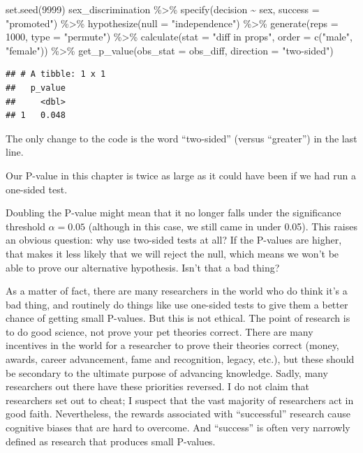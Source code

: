 \documentclass[
]{book}
\newenvironment{Shaded}{\begin{snugshade}}{\end{snugshade}}
\newcommand{\AttributeTok}[1]{\textcolor[rgb]{0.77,0.63,0.00}{#1}}
\newcommand{\DecValTok}[1]{\textcolor[rgb]{0.00,0.00,0.81}{#1}}
\newcommand{\FunctionTok}[1]{\textcolor[rgb]{0.00,0.00,0.00}{#1}}
\newcommand{\NormalTok}[1]{#1}
\newcommand{\SpecialCharTok}[1]{\textcolor[rgb]{0.00,0.00,0.00}{#1}}
\newcommand{\StringTok}[1]{\textcolor[rgb]{0.31,0.60,0.02}{#1}}
\begin{document}
\begin{Shaded}
\begin{Highlighting}[]
\FunctionTok{set.seed}\NormalTok{(}\DecValTok{9999}\NormalTok{)}
\NormalTok{sex\_discrimination }\SpecialCharTok{\%\textgreater{}\%}
    \FunctionTok{specify}\NormalTok{(decision }\SpecialCharTok{\textasciitilde{}}\NormalTok{ sex, }\AttributeTok{success =} \StringTok{"promoted"}\NormalTok{) }\SpecialCharTok{\%\textgreater{}\%}
    \FunctionTok{hypothesize}\NormalTok{(}\AttributeTok{null =} \StringTok{"independence"}\NormalTok{) }\SpecialCharTok{\%\textgreater{}\%}
    \FunctionTok{generate}\NormalTok{(}\AttributeTok{reps =} \DecValTok{1000}\NormalTok{, }\AttributeTok{type =} \StringTok{"permute"}\NormalTok{) }\SpecialCharTok{\%\textgreater{}\%}
    \FunctionTok{calculate}\NormalTok{(}\AttributeTok{stat =} \StringTok{"diff in props"}\NormalTok{, }\AttributeTok{order =} \FunctionTok{c}\NormalTok{(}\StringTok{"male"}\NormalTok{, }\StringTok{"female"}\NormalTok{)) }\SpecialCharTok{\%\textgreater{}\%}
    \FunctionTok{get\_p\_value}\NormalTok{(}\AttributeTok{obs\_stat =}\NormalTok{ obs\_diff, }\AttributeTok{direction =} \StringTok{"two{-}sided"}\NormalTok{)}
\end{Highlighting}
\end{Shaded}

\begin{verbatim}
## # A tibble: 1 x 1
##   p_value
##     <dbl>
## 1   0.048
\end{verbatim}

The only change to the code is the word ``two-sided'' (versus ``greater'') in the last line.

Our P-value in this chapter is twice as large as it could have been if we had run a one-sided test.

Doubling the P-value might mean that it no longer falls under the significance threshold \(\alpha = 0.05\) (although in this case, we still came in under 0.05). This raises an obvious question: why use two-sided tests at all? If the P-values are higher, that makes it less likely that we will reject the null, which means we won't be able to prove our alternative hypothesis. Isn't that a bad thing?

As a matter of fact, there are many researchers in the world who do think it's a bad thing, and routinely do things like use one-sided tests to give them a better chance of getting small P-values. But this is not ethical. The point of research is to do good science, not prove your pet theories correct. There are many incentives in the world for a researcher to prove their theories correct (money, awards, career advancement, fame and recognition, legacy, etc.), but these should be secondary to the ultimate purpose of advancing knowledge. Sadly, many researchers out there have these priorities reversed. I do not claim that researchers set out to cheat; I suspect that the vast majority of researchers act in good faith. Nevertheless, the rewards associated with ``successful'' research cause cognitive biases that are hard to overcome. And ``success'' is often very narrowly defined as research that produces small P-values.
\end{document}
